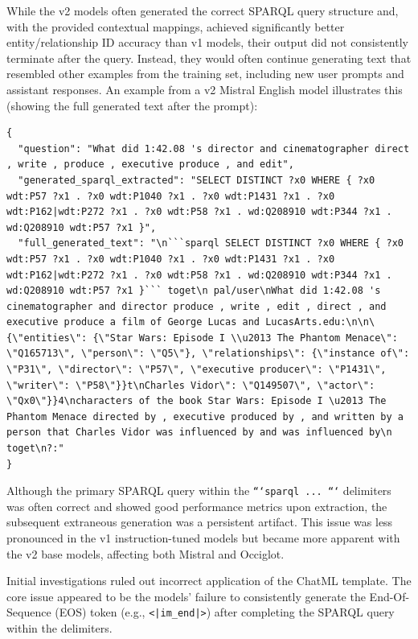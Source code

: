 While the v2 models often generated the correct SPARQL query structure and, with the provided contextual mappings, achieved significantly better entity/relationship ID accuracy than v1 models, their output did not consistently terminate after the query.
Instead, they would often continue generating text that resembled other examples from the training set, including new user prompts and assistant responses. 
An example from a v2 Mistral English model illustrates this (showing the full generated text after the prompt):
\begin{lstlisting}[breaklines]
{
  "question": "What did 1:42.08 's director and cinematographer direct , write , produce , executive produce , and edit",
  "generated_sparql_extracted": "SELECT DISTINCT ?x0 WHERE { ?x0 wdt:P57 ?x1 . ?x0 wdt:P1040 ?x1 . ?x0 wdt:P1431 ?x1 . ?x0 wdt:P162|wdt:P272 ?x1 . ?x0 wdt:P58 ?x1 . wd:Q208910 wdt:P344 ?x1 . wd:Q208910 wdt:P57 ?x1 }",
  "full_generated_text": "\n```sparql SELECT DISTINCT ?x0 WHERE { ?x0 wdt:P57 ?x1 . ?x0 wdt:P1040 ?x1 . ?x0 wdt:P1431 ?x1 . ?x0 wdt:P162|wdt:P272 ?x1 . ?x0 wdt:P58 ?x1 . wd:Q208910 wdt:P344 ?x1 . wd:Q208910 wdt:P57 ?x1 }``` toget\n pal/user\nWhat did 1:42.08 's cinematographer and director produce , write , edit , direct , and executive produce a film of George Lucas and LucasArts.edu:\n\n\
{\"entities\": {\"Star Wars: Episode I \\u2013 The Phantom Menace\": \"Q165713\", \"person\": \"Q5\"}, \"relationships\": {\"instance of\": \"P31\", \"director\": \"P57\", \"executive producer\": \"P1431\", \"writer\": \"P58\"}}t\nCharles Vidor\": \"Q149507\", \"actor\": \"Qx0\"}}4\ncharacters of the book Star Wars: Episode I \u2013 The Phantom Menace directed by , executive produced by , and written by a person that Charles Vidor was influenced by and was influenced by\n toget\n?:"
}
\end{lstlisting}
Although the primary SPARQL query within the \texttt{```sparql ... ```} delimiters was often correct and showed good performance metrics upon extraction, the subsequent extraneous generation was a persistent artifact. 
This issue was less pronounced in the v1 instruction-tuned models but became more apparent with the v2 base models, affecting both Mistral and Occiglot.

Initial investigations ruled out incorrect application of the ChatML template.
The core issue appeared to be the models' failure to consistently generate the End-Of-Sequence (EOS) token (e.g., \texttt{<|im\_end|>}) after completing the SPARQL query within the delimiters.

